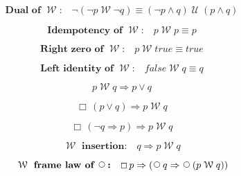 \documentclass[12pt, fleqn, leqno]{article}
\newcommand{\impl}{\ensuremath{\Rightarrow}}        %
\newcommand{\Until}{\;\mathcal{U}\;}
\newcommand{\Wait}{\;\mathcal{W}\;}
\newcommand{\Next}{\;\,\text{\raisebox{3.5pt}{\circle{6}}}}
\newcommand{\Always}{\Box\,}
\newcommand{\spacer}{\vspace{-30pt}}
\begin{document}
\spacer

\begin{equation}\label{E:DualWait2}
\textbf{Dual of $\Wait$:}\quad \neg (\neg p \Wait \neg q) \equiv (\neg p \land q) \Until (p \land q)
\end{equation}

\spacer

\begin{equation}\label{E:idempWait}
\textbf{Idempotency of $\Wait$:}\quad p \Wait p \equiv p
\end{equation}

\spacer

\begin{equation}\label{E:rightZeroWait}
\textbf{Right zero of $\Wait$:}\quad p \Wait true \equiv true
\end{equation}

\spacer

\begin{equation}\label{E:leftIdentWait}
\textbf{Left identity of $\Wait$:}\quad false \Wait q \equiv q
\end{equation}

\spacer

\begin{equation}\label{E:waitToOr}
p \Wait q \impl p \lor q
\end{equation}

\spacer

\begin{equation}\label{E:orToWait}
\Always (p\lor q) \impl p \Wait q
\end{equation}

\spacer

\begin{equation}\label{E:notqimpliespToWait}
\Always (\neg q \impl p) \impl p \Wait q
\end{equation}

\spacer

\begin{equation}\label{E:waitInsertion}
\textbf{$\Wait$ insertion:}\quad q \impl p \Wait q
\end{equation}

\spacer

\begin{equation}\label{E:waitframelawnext}
\textbf{$\Wait$ frame law of $\Next$:}\quad \Always p \impl (\Next q \impl \Next (p \Wait q))
\end{equation}
\end{document}
